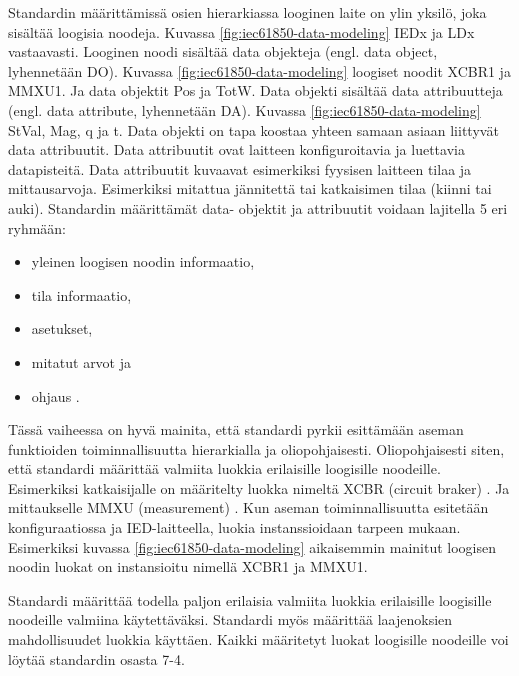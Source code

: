 Standardin määrittämissä osien hierarkiassa looginen laite on ylin yksilö, joka sisältää loogisia noodeja. Kuvassa \ref{fig:iec61850-data-modeling} IEDx ja LDx vastaavasti. Looginen noodi sisältää data objekteja (engl. data object, lyhennetään DO). Kuvassa \ref{fig:iec61850-data-modeling} loogiset noodit XCBR1 ja MMXU1. Ja data objektit Pos ja TotW. Data objekti sisältää data attribuutteja (engl. data attribute, lyhennetään DA). Kuvassa \ref{fig:iec61850-data-modeling} StVal, Mag, q ja t. Data objekti on tapa koostaa yhteen samaan asiaan liittyvät data attribuutit. Data attribuutit ovat laitteen konfiguroitavia ja luettavia datapisteitä. Data attribuutit kuvaavat esimerkiksi fyysisen laitteen tilaa ja mittausarvoja. Esimerkiksi mitattua jännitettä tai katkaisimen tilaa (kiinni tai auki). Standardin määrittämät data- objektit ja attribuutit voidaan lajitella 5 eri ryhmään:
\begin{itemize}
	\item yleinen loogisen noodin informaatio,
	\item tila informaatio,
	\item asetukset, 
	\item mitatut arvot ja
	\item ohjaus \cite[s.~25]{IEC61850-1}.
\end{itemize}

Tässä vaiheessa on hyvä mainita, että standardi pyrkii esittämään aseman funktioiden toiminnallisuutta hierarkialla ja oliopohjaisesti. Oliopohjaisesti siten, että standardi määrittää valmiita luokkia erilaisille loogisille noodeille. Esimerkiksi katkaisijalle on määritelty luokka nimeltä XCBR (circuit braker) \cite[s.~105--106]{IEC61850-7-4}. Ja mittaukselle MMXU (measurement) \cite[s.~57--58]{IEC61850-7-4}. Kun aseman toiminnallisuutta esitetään konfiguraatiossa ja IED-laitteella, luokia instanssioidaan tarpeen mukaan. Esimerkiksi kuvassa \ref{fig:iec61850-data-modeling} aikaisemmin mainitut loogisen noodin luokat on instansioitu nimellä XCBR1 ja MMXU1.

Standardi määrittää todella paljon erilaisia valmiita luokkia erilaisille loogisille noodeille valmiina käytettäväksi. Standardi myös määrittää laajenoksien mahdollisuudet luokkia käyttäen. Kaikki määritetyt luokat loogisille noodeille voi löytää standardin osasta 7-4.



